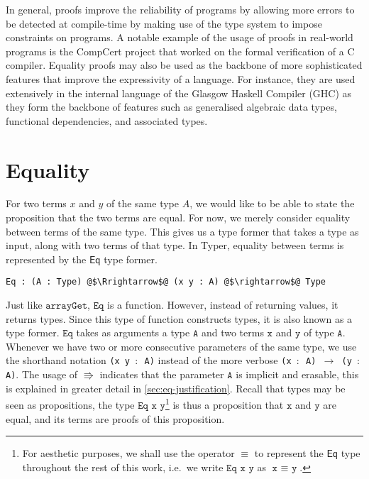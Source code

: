 \documentclass[12pt,twoside,maitrise]{dms}
\theoremstyle{definition}
\numberwithin{equation}{section}
\numberwithin{table}{chapter}
\numberwithin{figure}{chapter}
\newcommand\kw[1] {\textsf{#1}}
\newcommand\id[1] {\texttt{#1}}
\newcommand\fn[1] {\texttt{#1}}
\begin{document}
In general, proofs improve the reliability of programs by allowing more errors
to be detected at compile-time by making use of the type system to impose
constraints on programs. A notable example of the usage of proofs in real-world
programs is the CompCert project that worked on the formal verification of a C
compiler\cite{Leroy-Compcert-CACM}. Equality proofs may also be used as the
backbone of more sophisticated features that improve the expressivity of a
language. For instance, they are used extensively in the internal language of
the Glasgow Haskell Compiler (GHC) as they form the backbone of features such as
generalised algebraic data types, functional dependencies, and associated
types\cite{sulzmann2007systemfeq}.

\section{Equality}\label{sec:intro-eq}

For two terms $x$ and $y$ of the same type $A$, we would like to be able to
state the proposition that the two terms are equal. For now, we merely consider
equality between terms of the same type. This gives us a type former that takes
a type as input, along with two terms of that type. In Typer, equality between
terms is represented by the $\kw{Eq}$ type former.

\begin{verbatim}
Eq : (A : Type) @$\Rrightarrow$@ (x y : A) @$\rightarrow$@ Type
\end{verbatim}

Just like $\id{arrayGet}$, $\id{Eq}$ is a function. However, instead of
returning values, it returns types. Since this type of function constructs
types, it is also known as a type former. $\id{Eq}$ takes as arguments a type
$\id{A}$ and two terms $\id{x}$ and $\id{y}$ of type $\id{A}$. Whenever we have
two or more consecutive parameters of the same type, we use the shorthand
notation \fn{(x y $\colon$ A)} instead of the more verbose \fn{(x $\colon$ A)
  $\rightarrow$ (y $\colon$ A)}. The usage of $\Rrightarrow$ indicates that the
parameter $\id{A}$ is implicit and erasable, this is explained in greater detail
in \autoref{sec:eq-justification}. Recall that types may be seen as
propositions, the type $\fn{Eq x y}$\footnote{For aesthetic purposes, we shall
use the operator $\equiv$ to represent the $\kw{Eq}$ type throughout the rest of
this work, i.e.\ we write $\fn{Eq x y}$ as $\fn{x $\equiv$ y}$.} is thus a
proposition that $\fn{x}$ and $\fn{y}$ are equal, and its terms are proofs of
this proposition.
\end{document}
